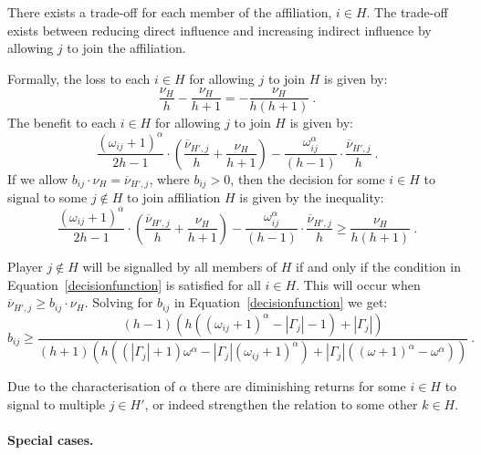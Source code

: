 \begin{subappendices}
There exists a trade-off for each member of the affiliation, $i \in H$. The trade-off exists between reducing direct influence and increasing indirect influence by allowing $j$ to join the affiliation.

Formally, the loss to each $i \in H$ for allowing $j$ to join $H$ is given by:
\begin{equation}
\frac{\nu_{H}}{h} - \frac{\nu_{H}}{h+1} = - \frac{\nu_{H}}{h(h + 1)} ~ .
\end{equation}
The benefit to each $i \in H$ for allowing $j$ to join $H$ is given by:
\begin{equation}
\frac{(\omega_{ij}+1)^{\alpha}}{2h-1} \cdot \left( \frac{\overline{\nu}_{H',j}}{h} + \frac{\nu_{H}}{h+1} \right) - \frac{\omega_{ij}^{\alpha}}{(h-1)} \cdot \frac{\overline{\nu}_{H',j}}{h} ~ .
\end{equation}
If we allow $b_{ij} \cdot \nu_{H} = \overline{\nu}_{H',j}$, where $b_{ij} > 0$, then the decision for some $i \in H$ to signal to some $j \notin H$ to join affiliation $H$ is given by the inequality:
\begin{equation} \label{decisionfunction}
\frac{(\omega_{ij}+1)^{\alpha}}{2h-1} \cdot \left( \frac{\overline{\nu}_{H',j}}{h} + \frac{\nu_{H}}{h+1} \right) - \frac{\omega_{ij}^{\alpha}}{(h-1)} \cdot \frac{\overline{\nu}_{H',j}}{h} \geqslant \frac{\nu_{H}}{h(h + 1)} ~ .
\end{equation}

Player $j \notin H$ will be signalled by all members of $H$ if and only if the condition in Equation~\ref{decisionfunction} is satisfied for all $i \in H$. This will occur when $\overline{\nu}_{H',j} \geqslant b_{ij} \cdot \nu_{H}$. Solving for $b_{ij}$ in Equation~\ref{decisionfunction} we get:
\begin{equation} \label{eq:b}
b_{ij} \geqslant \frac{(h-1)(h((\omega_{ij} + 1)^{\alpha} - |\Gamma_{j}| - 1) + |\Gamma_{j}|)}{(h+1)(h((|\Gamma_{j}| + 1)\omega^{\alpha} - |\Gamma_{j}| (\omega_{ij} + 1)^{\alpha}) + |\Gamma_{j}|((\omega+1)^{\alpha} - \omega^{\alpha}))} ~ .
\end{equation}

Due to the characterisation of $\alpha$ there are diminishing returns for some $i \in H$ to signal to multiple $j \in H'$, or indeed strengthen the relation to some other $k \in H$.

\paragraph{Special cases.}


\end{subappendices}
